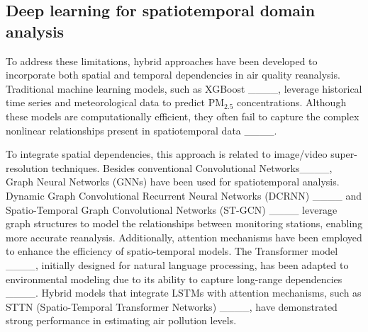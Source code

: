 \subsection{Deep learning for spatiotemporal domain analysis}
To address these limitations, hybrid approaches have been developed to incorporate both spatial and temporal dependencies in air quality reanalysis. Traditional machine learning models, such as XGBoost ____, leverage historical time series and meteorological data to predict PM\(_{2.5}\) concentrations. Although these models are computationally efficient, they often fail to capture the complex nonlinear relationships present in spatiotemporal data ____.

To integrate spatial dependencies, 
this approach is related to image/video super-resolution techniques. Besides conventional Convolutional Networks____, Graph Neural Networks (GNNs) have been used for spatiotemporal analysis. Dynamic Graph Convolutional Recurrent Neural Networks (DCRNN) ____ and Spatio-Temporal Graph Convolutional Networks (ST-GCN) ____ leverage graph structures to model the relationships between monitoring stations, enabling more accurate reanalysis. Additionally, attention mechanisms have been employed to enhance the efficiency of spatio-temporal models. The Transformer model ____, initially designed for natural language processing, has been adapted to environmental modeling due to its ability to capture long-range dependencies ____. Hybrid models that integrate LSTMs with attention mechanisms, such as STTN (Spatio-Temporal Transformer Networks) ____, have demonstrated strong performance in estimating air pollution levels.